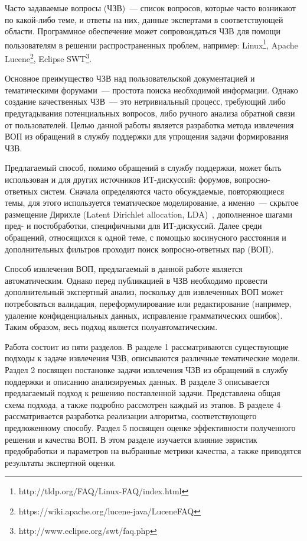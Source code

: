 \intro

Часто задаваемые вопросы (ЧЗВ)~--- список вопросов, которые часто возникают по какой-либо теме, и ответы на них, данные экспертами в соответствующей области. Программное обеспечение может сопровождаться ЧЗВ для помощи пользователям в решении распространенных проблем, например: Linux\footnote{http://tldp.org/FAQ/Linux-FAQ/index.html}, Apache Lucene\footnote{https://wiki.apache.org/lucene-java/LuceneFAQ}, Eclipse SWT\footnote{http://www.eclipse.org/swt/faq.php}.

Основное преимущество ЧЗВ над пользовательской документацией и тематическими форумами~--- простота поиска необходимой информации. Однако создание качественных ЧЗВ~--- это нетривиальный процесс, требующий либо предугадывания потенциальных вопросов, либо ручного анализа обратной связи от пользователей. Целью данной работы является разработка метода извлечения ВОП из обращений в службу поддержки для упрощения задачи формирования ЧЗВ.

Предлагаемый способ, помимо обращений в службу поддержки, может быть использован и для других источников ИТ-дискуссий: форумов, вопросно-ответных систем. Сначала определяются часто обсуждаемые, повторяющиеся темы, для этого используется тематическое моделирование, а именно~--- скрытое размещение Дирихле (Latent Dirichlet allocation, LDA)~\cite{LDA}, дополненное шагами пред- и постобработки, специфичными для ИТ-дискуссий. Далее среди обращений, относящихся к одной теме, с помощью косинусного расстояния и дополнительных фильтров проходит поиск вопросно-ответных пар (ВОП). 


Способ извлечения ВОП, предлагаемый в данной работе является автоматическим. Однако перед публикацией в ЧЗВ необходимо провести дополнительный экспертный анализ, поскольку для извлеченных ВОП может потребоваться валидация, переформулирование или редактирование (например, удаление конфиденциальных данных, исправление грамматических ошибок). Таким образом, весь подход является полуавтоматическим. 

Работа состоит из пяти разделов. В разделе 1 рассматриваются существующие подходы к задаче извлечения ЧЗВ, описываются различные тематические модели. Раздел 2 посвящен постановке задачи извлечения ЧЗВ из обращений в службу поддержки и описанию анализируемых данных. В разделе 3 описывается предлагаемый подход к решению поставленной задачи. Представлена общая схема подхода, а также подробно рассмотрен каждый из этапов. В разделе 4 рассматривается разработка реализации алгоритма, соответствующего предложенному способу. Раздел 5 посвящен оценке эффективности полученного решения и качества ВОП. В этом разделе изучается влияние эвристик предобработки и параметров на выбранные метрики качества, а также приводятся результаты экспертной оценки.